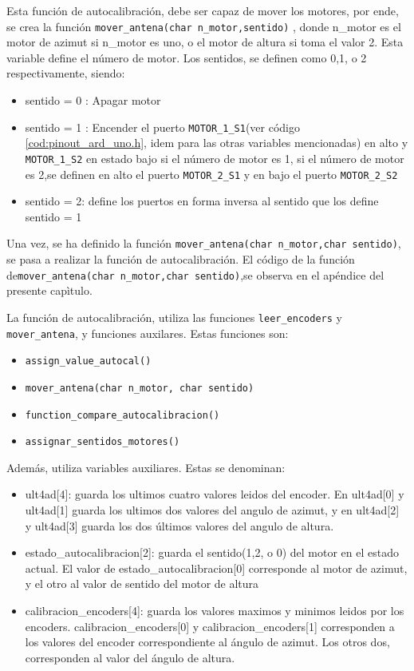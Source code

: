 Esta función de autocalibración, debe ser capaz de mover los motores, por ende, se crea la función \texttt{mover_antena(char n_motor,sentido)} , donde n\_motor es el motor de azimut si n\_motor es uno, o el motor de altura si toma el valor 2. Esta variable define el número de motor. Los sentidos, se definen  como 0,1, o 2 respectivamente, siendo: 
\begin{itemize}
	\item sentido = 0 :  Apagar motor 
	\item sentido = 1 :  Encender el puerto  \texttt{MOTOR_1_S1}(ver código \ref{cod:pinout_ard_uno.h}, idem para las otras variables mencionadas) en alto y \texttt{MOTOR_1_S2} en estado bajo si el número de motor es 1, si el número de motor es 2,se definen en alto el puerto  \texttt{MOTOR_2_S1} y en bajo el puerto 
	\texttt{MOTOR_2_S2} 
	\item sentido = 2: define los puertos en forma inversa al sentido que los define sentido = 1 
\end{itemize}
 
Una vez, se ha definido la función \texttt{mover_antena(char n\_motor,char sentido)}, se pasa a realizar la función de autocalibración.  El código de la función de\texttt{mover_antena(char n\_motor,char sentido)},se observa en el apéndice del presente capìtulo.   

La función de autocalibración, utiliza las funciones \texttt{leer_encoders} y \texttt{mover_antena}, y funciones auxilares. Estas funciones son: 

\begin{itemize}
	\item \texttt{assign_value_autocal()}  
	\item \texttt{mover_antena(char n_motor, char sentido)}   
	\item \texttt{function_compare_autocalibracion()}  
	\item \texttt{assignar_sentidos_motores()}
\end{itemize}

Además, utiliza variables auxiliares. Estas se denominan: 
\begin{itemize}
	\item ult4ad[4]: guarda los ultimos cuatro valores leidos del encoder. En ult4ad[0] y ult4ad[1] guarda los ultimos dos valores del angulo de azimut, y en ult4ad[2] y ult4ad[3] guarda los dos últimos valores del angulo de altura. 
	\item estado\_autocalibracion[2]: guarda el sentido(1,2, o 0) del motor en el estado actual. El valor de estado\_autocalibracion[0] corresponde al motor de azimut, y el otro al valor de sentido del motor de altura 
	\item calibracion\_encoders[4]: guarda los valores maximos y minimos leidos por los encoders. calibracion\_encoders[0] y calibracion\_encoders[1] corresponden a los valores del encoder correspondiente al ángulo de azimut. Los otros dos, corresponden al valor del ángulo de altura.   
\end{itemize}

